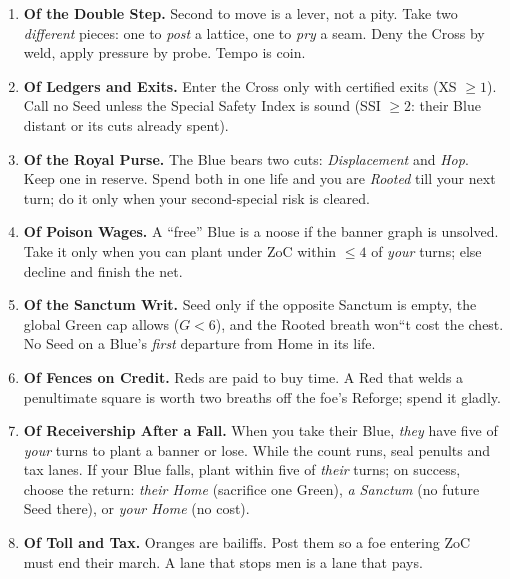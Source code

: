 \documentclass[11pt]{article}
\begin{document}
\begin{enumerate}[leftmargin=\textit{,label=\Roman}.]

\item \textbf{Of the Double Step.} Second to move is a lever, not a pity. Take two \emph{different} pieces: one to \emph{post} a lattice, one to \emph{pry} a seam. Deny the Cross by weld, apply pressure by probe. Tempo is coin.

\item \textbf{Of Ledgers and Exits.} Enter the Cross only with certified exits (\textsc{XS} $\ge 1$). Call no Seed unless the Special Safety Index is sound (\textsc{SSI} $\ge 2$: their Blue distant or its cuts already spent).

\item \textbf{Of the Royal Purse.} The Blue bears two cuts: \emph{Displacement} and \emph{Hop}. Keep one in reserve. Spend both in one life and you are \emph{Rooted} till your next turn; do it only when your second-special risk is cleared.

\item \textbf{Of Poison Wages.} A ``free'' Blue is a noose if the banner graph is unsolved. Take it only when you can plant under ZoC within $\le 4$ of \emph{your} turns; else decline and finish the net.

\item \textbf{Of the Sanctum Writ.} Seed only if the opposite Sanctum is empty, the global Green cap allows ($G<6$), and the Rooted breath won``t cost the chest. No Seed on a Blue's \emph{first} departure from Home in its life.

\item \textbf{Of Fences on Credit.} Reds are paid to buy time. A Red that welds a penultimate square is worth two breaths off the foe's Reforge; spend it gladly.

\item \textbf{Of Receivership After a Fall.} When you take their Blue, \emph{they} have five of \emph{your} turns to plant a banner or lose. While the count runs, seal penults and tax lanes. If your Blue falls, plant within five of \emph{their} turns; on success, choose the return: \emph{their Home} (sacrifice one Green), \emph{a Sanctum} (no future Seed there), or \emph{your Home} (no cost).

\item \textbf{Of Toll and Tax.} Oranges are bailiffs. Post them so a foe entering ZoC must end their march. A lane that stops men is a lane that pays.


\end{enumerate}
\end{document}
